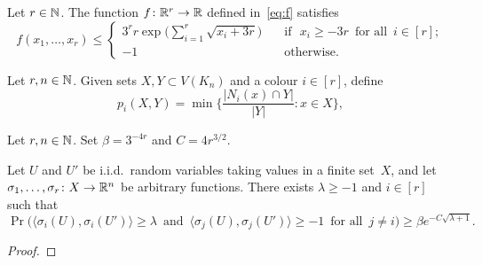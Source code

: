 \begin{lemma}\label{lem:special-function}
    Let $r \in \mathbb{N}$. The function $f \colon \mathbb{R}^r \rightarrow \mathbb{R}$ defined in~\eqref{eq:f} satisfies
    $$
    f(x_1,\dots,x_r) \le \left\{\begin{array}{cl}
    3^r r \exp\bigg( \displaystyle\sum_{i = 1}^r \sqrt{ x_i + 3r } \bigg) \quad & \text{if } \,\, x_i \ge - 3r \,\text{ for all }\, i \in [r];\\[+3ex]
    -1 & \text{otherwise.} 
    \end{array} \right.
    $$
\end{lemma}



\begin{definition}
    \label{def:p}
    Let $r, n\in\mathbb{N}$. Given sets $X,Y \subset V(K_n)$ and a colour $i \in [r]$, define
    $$p_i(X,Y) = \min\bigg\{ \frac{|N_i(x) \cap Y|}{|Y|} : x \in X \bigg\},$$
\end{definition}

\begin{lemma}
    \label{lem:geometric}
    Let $r, n\in\mathbb{N}$. Set $\beta = 3^{-4r}$ and $C = 4r^{3/2}$.

    Let\/ $U$ and\/ $U'$ be i.i.d.~random variables taking values in a finite set~$X$, and let $\sigma_1,\ldots,\sigma_r \colon X \rightarrow \mathbb{R}^n$ be arbitrary functions. There exists $\lambda\ge-1$ and\/ $i\in[r]$ such that
    $$\Pr\Big( \big\langle \sigma_i(U),\sigma_i(U') \big\rangle \ge \lambda \, \text{ and } \, \big\langle \sigma_j(U), \sigma_j(U') \big\rangle \ge -1 \, \text{ for all } \, j \ne i \Big) \ge \beta e^{- C\sqrt{\lambda + 1}}.$$
\end{lemma}

\begin{proof}
\end{proof}



